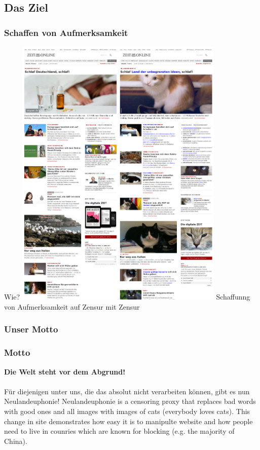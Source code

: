 \documentclass [xcolor=dvipsnames] {beamer}
\begin{document}
\subsection{Das Ziel}
\subsubsection{Schaffen von Aufmerksamkeit}
\begin{frame}
	\begin{center}
		{
			{\Huge Wie?}
		}
		\only<3>
		{
			\includegraphics[width=10cm]{combined}
		}
		\only<1>
		{
			Schaffunng von Aufmerksamkeit auf Zensur mit Zensur
		}
	\end{center}
\end{frame}

\subsubsection{Unser Motto}
\begin{frame}
	\frametitle{\sc Motto}
	\begin{center}
		{
			{\bf Die Welt steht vor dem Abgrund!}\\ \ \\ Für diejenigen unter uns, die das absolut nicht verarbeiten können, gibt es nun Neulandeuphonie!
		}
		\only<2>
		{
			Neulandeuphonie is a censoring proxy that replaces bad words with good ones and all images with images of cats (everybody loves cats). This change in site demonstrates how easy it is to manipulte website and how people need to live in counries which are known for blocking (e.g. the majority of China).
		}
	\end{center}
\end{frame}
\end{document}
